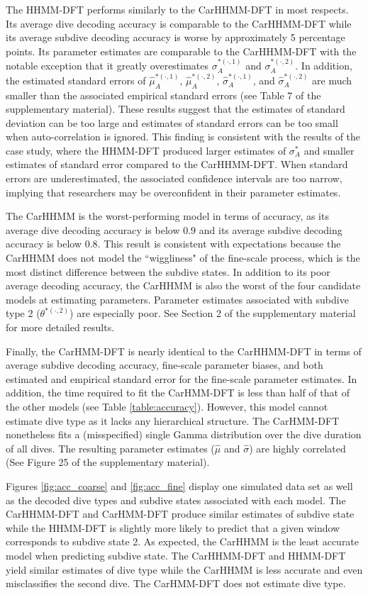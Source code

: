 The HHMM-DFT performs similarly to the CarHHMM-DFT in most respects. Its average dive decoding accuracy is comparable to the CarHHMM-DFT while its average subdive decoding accuracy is worse by approximately 5 percentage points. Its parameter estimates are comparable to the CarHHMM-DFT with the notable exception that it greatly overestimates $\sigma_A^{*(\cdot,1)}$ and $\sigma_A^{*(\cdot,2)}$. In addition, the estimated standard errors of $\hat \mu_A^{*(\cdot,1)}$, $\hat \mu_A^{*(\cdot,2)}$, $\hat \sigma_A^{*(\cdot,1)}$, and $\hat \sigma_A^{*(\cdot,2)}$ are much smaller than the associated empirical standard errors (see Table 7 of the supplementary material). These results suggest that the estimates of standard deviation can be too large and estimates of standard errors can be too small when auto-correlation is ignored. This finding is consistent with the results of the case study, where the HHMM-DFT produced larger estimates of $\sigma_A^*$ and smaller estimates of standard error compared to the CarHHMM-DFT. When standard errors are underestimated, the associated confidence intervals are too narrow, implying that researchers may be overconfident in their parameter estimates.

The CarHHMM is the worst-performing model in terms of accuracy, as its average dive decoding accuracy is below $0.9$ and its average subdive decoding accuracy is below $0.8$. This result is consistent with expectations because the CarHHMM does not model the ``wiggliness" of the fine-scale process, which is the most distinct difference between the subdive states. In addition to its poor average decoding accuracy, the CarHHMM is also the worst of the four candidate models at estimating parameters. Parameter estimates associated with subdive type 2 ($\theta^{*(\cdot,2)}$) are especially poor. See Section 2 of the supplementary material for more detailed results.

Finally, the CarHMM-DFT is nearly identical to the CarHHMM-DFT in terms of average subdive decoding accuracy, fine-scale parameter biases, and both estimated and empirical standard error for the fine-scale parameter estimates. In addition, the time required to fit the CarHMM-DFT is less than half of that of the other models (see Table \ref{table:accuracy}). However, this model cannot estimate dive type as it lacks any hierarchical structure. The CarHMM-DFT nonetheless fits a (misspecified) single Gamma distribution over the dive duration of all dives. The resulting parameter estimates ($\hat \mu$ and $\hat \sigma$) are highly correlated (See Figure 25 of the supplementary material).

Figures \ref{fig:acc_coarse} and \ref{fig:acc_fine} display one simulated data set as well as the decoded dive types and subdive states associated with each model. The CarHHMM-DFT and CarHMM-DFT produce similar estimates of subdive state while the HHMM-DFT is slightly more likely to predict that a given window corresponds to subdive state 2. As expected, the CarHHMM is the least accurate model when predicting subdive state. The CarHHMM-DFT and HHMM-DFT yield similar estimates of dive type while the CarHHMM is less accurate and even misclassifies the second dive. The CarHMM-DFT does not estimate dive type.